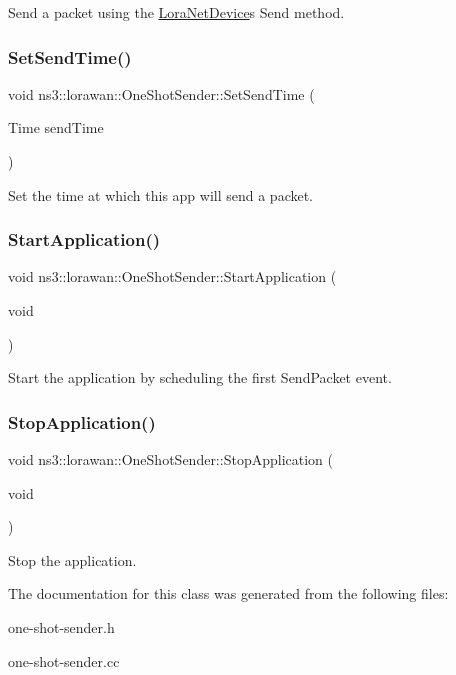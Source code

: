 Send a packet using the \hyperlink{classns3_1_1lorawan_1_1LoraNetDevice}{Lora\+Net\+Device}\textquotesingle{}s Send method. \mbox{\label{classns3_1_1lorawan_1_1OneShotSender_ad2e2d481f9332896e2328ea21790a994}} 
\subsubsection{\texorpdfstring{Set\+Send\+Time()}{SetSendTime()}}
{\footnotesize\ttfamily void ns3\+::lorawan\+::\+One\+Shot\+Sender\+::\+Set\+Send\+Time (\begin{DoxyParamCaption}\item[{Time}]{send\+Time }\end{DoxyParamCaption})}

Set the time at which this app will send a packet. \mbox{\label{classns3_1_1lorawan_1_1OneShotSender_aa957e6ecac972a05314f25a9313aafd7}} 
\subsubsection{\texorpdfstring{Start\+Application()}{StartApplication()}}
{\footnotesize\ttfamily void ns3\+::lorawan\+::\+One\+Shot\+Sender\+::\+Start\+Application (\begin{DoxyParamCaption}\item[{void}]{ }\end{DoxyParamCaption})}

Start the application by scheduling the first Send\+Packet event. \mbox{\label{classns3_1_1lorawan_1_1OneShotSender_a1014b9f4f5ef8b38f15885c2db109a84}} 
\subsubsection{\texorpdfstring{Stop\+Application()}{StopApplication()}}
{\footnotesize\ttfamily void ns3\+::lorawan\+::\+One\+Shot\+Sender\+::\+Stop\+Application (\begin{DoxyParamCaption}\item[{void}]{ }\end{DoxyParamCaption})}

Stop the application. 

The documentation for this class was generated from the following files\+:\begin{DoxyCompactItemize}
\item 
one-\/shot-\/sender.\+h\item 
one-\/shot-\/sender.\+cc\end{DoxyCompactItemize}
